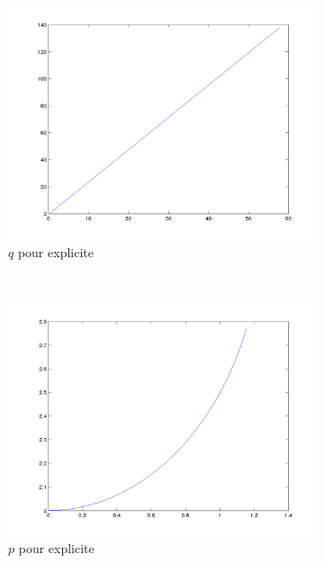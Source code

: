 \begin{figure}
  \centering
  \begin{subfigure}[b]{0.45\textwidth}
    \includegraphics[width=\textwidth]{images/Q1_explicite_q.png}
    \caption{$q$ pour explicite}
    \label{fig:q1_explicite_q}
  \end{subfigure}%
  ~ %
  \begin{subfigure}[b]{0.45\textwidth}
    \includegraphics[width=\textwidth]{images/Q1_explicite_p.png}
    \caption{$p$ pour explicite}
    \label{fig:q1_explicite_p}
  \end{subfigure}
  \begin{subfigure}[b]{0.45\textwidth}

\end{subfigure}
\end{figure}

